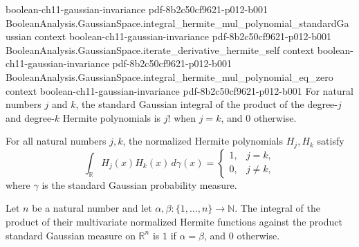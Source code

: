 \begin{lemma}
  {boolean-ch11-gaussian-invariance}
  {pdf-8b2c50cf9621-p012-b001}
\proofstep
  {BooleanAnalysis.GaussianSpace.integral_hermite_mul_polynomial_standardGaussian}
  {context}
  {boolean-ch11-gaussian-invariance}
  {pdf-8b2c50cf9621-p012-b001}
\proofstep
  {BooleanAnalysis.GaussianSpace.iterate_derivative_hermite_self}
  {context}
  {boolean-ch11-gaussian-invariance}
  {pdf-8b2c50cf9621-p012-b001}
\proofstep
  {BooleanAnalysis.GaussianSpace.integral_hermite_mul_polynomial_eq_zero}
  {context}
  {boolean-ch11-gaussian-invariance}
  {pdf-8b2c50cf9621-p012-b001}
For natural numbers $j$ and $k$, the standard Gaussian integral of the product of the
degree-$j$ and degree-$k$ Hermite polynomials is $j!$ when $j=k$, and $0$ otherwise.
\end{lemma}

\begin{lemma}
\label{BooleanAnalysis.GaussianSpace.integral_normalizedHermite_mul_standardGaussian}
\leanok
{}
For all natural numbers $j,k$, the normalized Hermite polynomials $H_j,H_k$ satisfy
\[
\int_{\mathbb R}H_j(x)H_k(x)\,d\gamma(x)=\begin{cases}1,&j=k,\\0,&j\ne k,\end{cases}
\]
where $\gamma$ is the standard Gaussian probability measure.
\end{lemma}

\begin{lemma}
\label{BooleanAnalysis.GaussianSpace.integral_hermiteFunction_mul}
\leanok
{}
Let $n$ be a natural number and let $\alpha,\beta:\{1,\ldots,n\}\to\mathbb N$. The
integral of the product of their multivariate normalized Hermite functions against the
product standard Gaussian measure on $\mathbb R^n$ is $1$ if $\alpha=\beta$, and $0$
otherwise.
\end{lemma}

